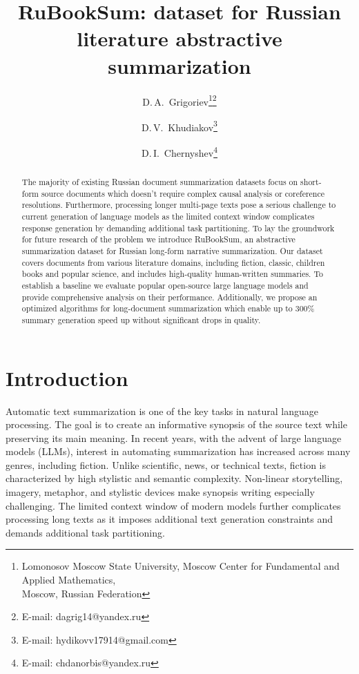 \documentclass{superfri}
\begin{document}
\raggedbottom
\author{D.\,A.~Grigoriev\footnote{\label{msu}Lomonosov Moscow State University, Moscow Center for Fundamental and Applied Mathematics, \\ Moscow, Russian Federation}\footnote{E-mail: dagrig14@yandex.ru} \and D.\,V.~Khudiakov\footnote{E-mail: hydikovv17914@gmail.com} \and D.\,I.~Chernyshev\footnote{E-mail: chdanorbis@yandex.ru}}

\title{RuBookSum: dataset for Russian literature abstractive summarization}

\maketitle{}

\begin{abstract}
The majority of existing Russian document summarization datasets focus on short-form source documents which doesn't require complex causal analysis or 
coreference resolutions. Furthermore, processing longer multi-page texts pose a serious challenge to current generation of language models as the 
limited context window complicates response generation by demanding additional task partitioning. 
To lay the groundwork for future research of the problem we introduce RuBookSum, an abstractive summarization dataset for Russian long-form narrative summarization. 
Our dataset covers documents from various literature domains, including fiction, classic, children books and popular science, and includes high-quality human-written 
summaries. To establish a baseline we evaluate popular open-source large language models and provide comprehensive analysis on their performance. Additionally, 
we propose an optimized algorithms for long-document summarization which enable up to 300\% summary generation speed up without significant drops in quality.

\end{abstract}




\section*{Introduction}
Automatic text summarization is one of the key tasks in natural language processing. The goal is to create an informative synopsis of the source text while preserving its main meaning.
In recent years, with the advent of large language models (LLMs), interest in automating summarization has increased across many genres, including fiction.
Unlike scientific, news, or technical texts, fiction is characterized by high stylistic and semantic complexity.
Non-linear storytelling, imagery, metaphor, and stylistic devices make synopsis writing especially challenging.
The limited context window of modern models further complicates processing long texts as it imposes additional text generation constraints and demands additional task partitioning.
\end{document}
